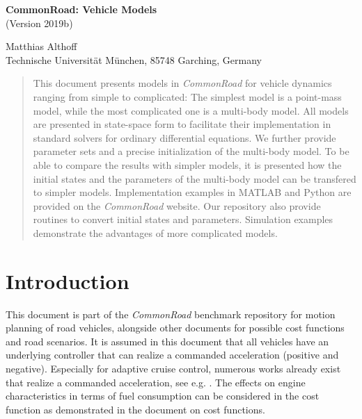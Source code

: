 \documentclass[11pt,a4paper]{article}
\renewcommand{\^}[1]{^{(#1)}}
\begin{document}
\mbox{} \vspace{0.8cm} \mbox{}
\begin{center} {\Huge\textbf{CommonRoad: Vehicle Models} \\[0.3cm] \huge(Version 2019b)} \end{center}
\vspace{0.2cm}
\begin{center} {\large Matthias Althoff} \\[0.2cm] Technische Universit\"at M\"unchen, 85748 Garching, Germany
\end{center}
\vspace{0.2cm}

\noindent

\begin{abstract}
This document presents models in \textit{CommonRoad} for vehicle dynamics ranging from simple to complicated: The simplest model is a point-mass model, while the most complicated one is a multi-body model. All models are presented in state-space form to facilitate their implementation in standard solvers for ordinary differential equations. We further provide parameter sets and a precise initialization of the multi-body model. To be able to compare the results with simpler models, it is presented how the initial states and the parameters of the multi-body model can be transfered to simpler models. Implementation examples in MATLAB and Python are provided on the \textit{CommonRoad} website. Our repository also provide routines to convert initial states and parameters. Simulation examples demonstrate the advantages of more complicated models.
\end{abstract}


\setcounter{tocdepth}{2}
{\small
\tableofcontents}



\section{Introduction}
\label{sec:introduction}

This document is part of the \textit{CommonRoad} benchmark repository for motion planning of road vehicles, alongside other documents for possible cost functions and road scenarios. It is assumed in this document that all vehicles have an underlying controller that can realize a commanded acceleration (positive and negative). Especially for adaptive cruise control, numerous works already exist that realize a commanded acceleration, see e.g. \cite{Shladover1991,Kim2007}. The effects on engine characteristics in terms of fuel consumption can be considered in the cost function as demonstrated in the document on cost functions.
\end{document}
